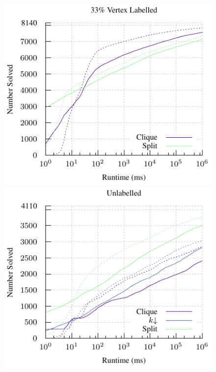 \documentclass{llncs}
\begin{document}
\begin{figure}[p]
    \includegraphics*[scale=0.7]{plots/33v-par-cumulative.pdf}
    \hfill
    \includegraphics*[scale=0.7]{plots/plain-par-cumulative.pdf}


\end{figure}
\end{document}
